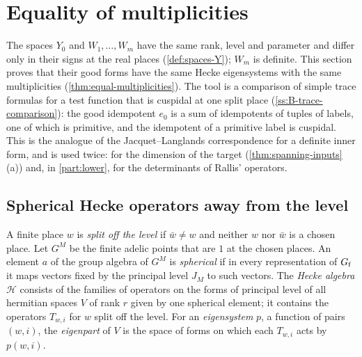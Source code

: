 \section{Equality of multiplicities}\label{sec:multiplicities}

The spaces $Y_0$ and $W_1,\dots,W_m$ have the same rank, level and parameter and differ only in their signs at the real places
(\cref{def:spaces-Y}); $W_m$ is definite. This section proves that their good forms have the same Hecke eigensystems with the same
multiplicities (\cref{thm:equal-multiplicities}). The tool is a comparison of simple trace formulas for a test function that is cuspidal at one split
place (\cref{ss:B-trace-comparison}): the good idempotent $e_0$ is a sum of idempotents of tuples of labels, one of which is primitive, and the
idempotent of a primitive label is cuspidal. This is the analogue of the Jacquet--Langlands correspondence for a definite inner form, and is used twice:
for the dimension of the target (\cref{thm:spanning-inputs}(a)) and, in \cref{part:lower}, for the determinants of Rallis' operators.

\subsection{Spherical Hecke operators away from the level}\label{ss:hecke-away}
A finite place $w$ is \emph{split off the level} if $\bar w\ne w$ and neither $w$ nor $\bar w$ is a chosen place. Let $G^M$ be the finite adelic points that are $1$ at the chosen
places. An element $a$ of the group algebra of $G^M$ is \emph{spherical} if in every representation of $G_{\rm f}$ it maps vectors fixed by the principal level $J_M$ to such
vectors. The \emph{Hecke algebra} $\mathcal H$ consists of the families of operators on the forms of principal level of all hermitian spaces $V$ of rank $r$ given by one
spherical element; it contains the operators $T_{w,i}$ for $w$ split off the level. For an \emph{eigensystem} $p$, a function of pairs $(w,i)$, the \emph{eigenpart} of $V$ is the
space of forms on which each $T_{w,i}$ acts by $p(w,i)$.

